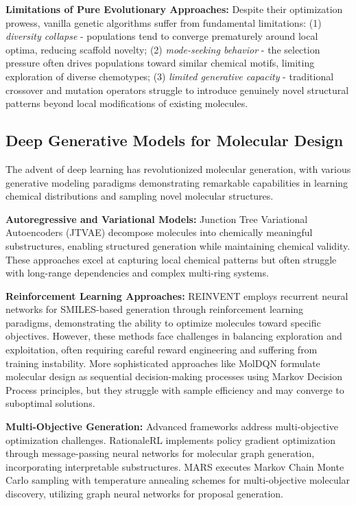 \documentclass[lettersize,journal]{IEEEtran}
\begin{document}
\noindent \textbf{Limitations of Pure Evolutionary Approaches:} Despite their optimization prowess, vanilla genetic algorithms suffer from fundamental limitations: (1) \textit{diversity collapse} - populations tend to converge prematurely around local optima, reducing scaffold novelty; (2) \textit{mode-seeking behavior} - the selection pressure often drives populations toward similar chemical motifs, limiting exploration of diverse chemotypes; (3) \textit{limited generative capacity} - traditional crossover and mutation operators struggle to introduce genuinely novel structural patterns beyond local modifications of existing molecules.

\subsection{Deep Generative Models for Molecular Design}

The advent of deep learning has revolutionized molecular generation, with various generative modeling paradigms demonstrating remarkable capabilities in learning chemical distributions and sampling novel molecular structures.

\noindent \textbf{Autoregressive and Variational Models:} Junction Tree Variational Autoencoders (JTVAE) \cite{jinJunctionTreeVariational2018} decompose molecules into chemically meaningful substructures, enabling structured generation while maintaining chemical validity. These approaches excel at capturing local chemical patterns but often struggle with long-range dependencies and complex multi-ring systems.

\noindent \textbf{Reinforcement Learning Approaches:} REINVENT \cite{olivecronaMolecularDeNovoDesign2017} employs recurrent neural networks for SMILES-based generation through reinforcement learning paradigms, demonstrating the ability to optimize molecules toward specific objectives. However, these methods face challenges in balancing exploration and exploitation, often requiring careful reward engineering and suffering from training instability. More sophisticated approaches like MolDQN \cite{zhouOptimizationMolecularRep2019} formulate molecular design as sequential decision-making processes using Markov Decision Process principles, but they struggle with sample efficiency and may converge to suboptimal solutions.

\noindent \textbf{Multi-Objective Generation:} Advanced frameworks address multi-objective optimization challenges. RationaleRL \cite{jinMultiObjectiveMoleculeGeneration2020} implements policy gradient optimization through message-passing neural networks for molecular graph generation, incorporating interpretable substructures. MARS \cite{xieMARS2021} executes Markov Chain Monte Carlo sampling with temperature annealing schemes for multi-objective molecular discovery, utilizing graph neural networks for proposal generation.
\end{document}
